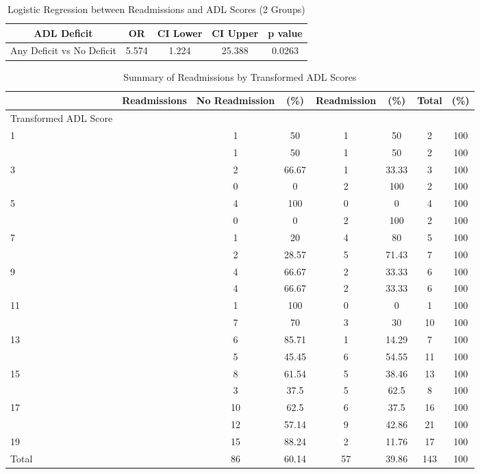 \documentclass[12pt,]{article}
\begin{document}
\begin{table}[!h]

\caption{\label{tab:unnamed-chunk-17}Logistic Regression between Readmissions and ADL Scores (2 Groups)}
\centering
\begin{tabular}{ccccc}
\toprule
ADL Deficit & OR & CI Lower & CI Upper & p value\\
\midrule
\rowcolor{white}  Any Deficit vs No Deficit & 5.574 & 1.224 & 25.388 & 0.0263\\
\bottomrule
\end{tabular}
\end{table}

\pagebreak

\begin{table}[!h]

\caption{\label{tab:unnamed-chunk-18}Summary of Readmissions by Transformed ADL Scores}
\centering
\begin{tabular}{>{\centering\arraybackslash}p{5cm}ccccccc}
\toprule
  & Readmissions & No Readmission & (\%) & Readmission & (\%) & Total & (\%)\\
\midrule
Transformed ADL Score &  &  &  &  &  &  & \\
\rowcolor[HTML]{E3E5E7}  1 &  & 1 & 50 & 1 & 50 & 2 & 100\\
2 &  & 1 & 50 & 1 & 50 & 2 & 100\\
\rowcolor[HTML]{E3E5E7}  3 &  & 2 & 66.67 & 1 & 33.33 & 3 & 100\\
4 &  & 0 & 0 & 2 & 100 & 2 & 100\\
\addlinespace
\rowcolor[HTML]{E3E5E7}  5 &  & 4 & 100 & 0 & 0 & 4 & 100\\
6 &  & 0 & 0 & 2 & 100 & 2 & 100\\
\rowcolor[HTML]{E3E5E7}  7 &  & 1 & 20 & 4 & 80 & 5 & 100\\
8 &  & 2 & 28.57 & 5 & 71.43 & 7 & 100\\
\rowcolor[HTML]{E3E5E7}  9 &  & 4 & 66.67 & 2 & 33.33 & 6 & 100\\
\addlinespace
10 &  & 4 & 66.67 & 2 & 33.33 & 6 & 100\\
\rowcolor[HTML]{E3E5E7}  11 &  & 1 & 100 & 0 & 0 & 1 & 100\\
12 &  & 7 & 70 & 3 & 30 & 10 & 100\\
\rowcolor[HTML]{E3E5E7}  13 &  & 6 & 85.71 & 1 & 14.29 & 7 & 100\\
14 &  & 5 & 45.45 & 6 & 54.55 & 11 & 100\\
\addlinespace
\rowcolor[HTML]{E3E5E7}  15 &  & 8 & 61.54 & 5 & 38.46 & 13 & 100\\
16 &  & 3 & 37.5 & 5 & 62.5 & 8 & 100\\
\rowcolor[HTML]{E3E5E7}  17 &  & 10 & 62.5 & 6 & 37.5 & 16 & 100\\
18 &  & 12 & 57.14 & 9 & 42.86 & 21 & 100\\
\rowcolor[HTML]{E3E5E7}  19 &  & 15 & 88.24 & 2 & 11.76 & 17 & 100\\
\addlinespace
Total &  & 86 & 60.14 & 57 & 39.86 & 143 & 100\\
\bottomrule
\end{tabular}
\end{table}
\end{document}
